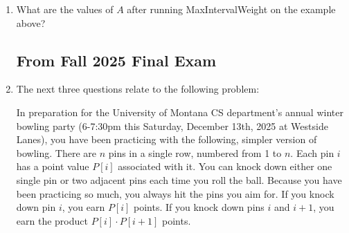\documentclass[11pt]{article}
\begin{document}
\begin{enumerate}
   \begin{algo}
    MaxIntervalWeight($s[1..n], f[1..n], w[1..n], p[1..n]$):\+\\
    \# initialize an array A\\
    \\
    \\
    \\
    \# do we have any base cases?\\
    \\
    \\
    \\
    \\
    \\
    \# how should we fill in the rest of the array?\\
    \\
    \\
    \\
    \\
    \\
    \\
    \\
    \\
    \# what should we return to get the final answer?\\
    \\
    \\
    \\
    \hspace{5in}
    \end{algo}

\item What are the values of $A$ after running MaxIntervalWeight on the example above?



\newpage
\subsection*{From Fall 2025 Final Exam}

\item[] The next three questions relate to the following problem:

In preparation for the University of Montana CS department's annual winter bowling party
(6-7:30pm this Saturday, December 13th, 2025 at Westside Lanes), you have been practicing with the following, simpler
version of bowling. There are $n$ pins in a single row, numbered from 1 to $n$.
Each pin $i$ has a point value $P[i]$ associated with it. You can knock down either one single pin
or two adjacent pins each time you roll the ball. Because you have been practicing so much, you
always hit the pins you aim for.
If you knock down pin $i$, you earn $P[i]$ points. If you knock down pins $i$ and $i+1$,
you earn the product $P[i] \cdot P[i+1]$ points.


\end{enumerate}
\end{document}
